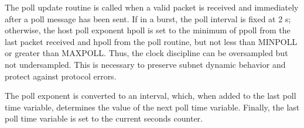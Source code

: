 The poll update routine is called when a valid packet is received and
immediately after a poll message has been sent.  If in a burst, the
poll interval is fixed at 2 s; otherwise, the host poll exponent
hpoll is set to the minimum of ppoll from the last packet received
and hpoll from the poll routine, but not less than MINPOLL or greater
than MAXPOLL.  Thus, the clock discipline can be oversampled but not
undersampled.  This is necessary to preserve subnet dynamic behavior
and protect against protocol errors.

The poll exponent is converted to an interval, which, when added to
the last poll time variable, determines the value of the next poll
time variable.  Finally, the last poll time variable is set to the
current seconds counter.
